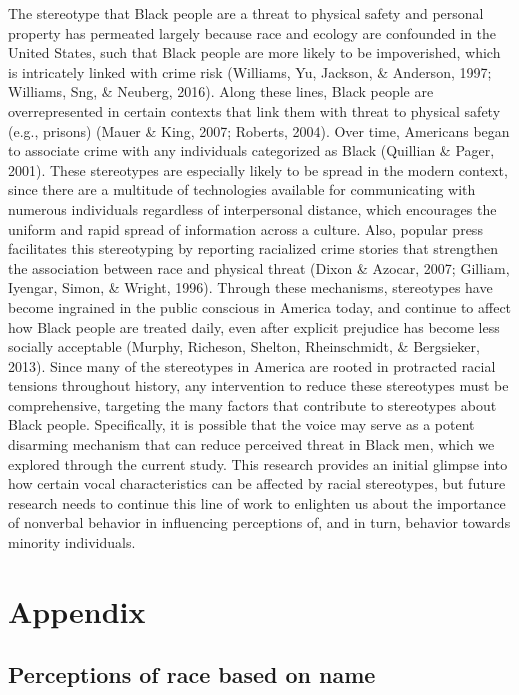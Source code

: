 \documentclass[
  english,
  man, noextraspace,floatsintext]{apa6}
\begin{document}
The stereotype that Black people are a threat to physical safety and personal property has permeated largely because race and ecology are confounded in the United States, such that Black people are more likely to be impoverished, which is intricately linked with crime risk (Williams, Yu, Jackson, \& Anderson, 1997; Williams, Sng, \& Neuberg, 2016). Along these lines, Black people are overrepresented in certain contexts that link them with threat to physical safety (e.g., prisons) (Mauer \& King, 2007; Roberts, 2004). Over time, Americans began to associate crime with any individuals categorized as Black (Quillian \& Pager, 2001). These stereotypes are especially likely to be spread in the modern context, since there are a multitude of technologies available for communicating with numerous individuals regardless of interpersonal distance, which encourages the uniform and rapid spread of information across a culture. Also, popular press facilitates this stereotyping by reporting racialized crime stories that strengthen the association between race and physical threat (Dixon \& Azocar, 2007; Gilliam, Iyengar, Simon, \& Wright, 1996). Through these mechanisms, stereotypes have become ingrained in the public conscious in America today, and continue to affect how Black people are treated daily, even after explicit prejudice has become less socially acceptable (Murphy, Richeson, Shelton, Rheinschmidt, \& Bergsieker, 2013). Since many of the stereotypes in America are rooted in protracted racial tensions throughout history, any intervention to reduce these stereotypes must be comprehensive, targeting the many factors that contribute to stereotypes about Black people. Specifically, it is possible that the voice may serve as a potent disarming mechanism that can reduce perceived threat in Black men, which we explored through the current study. This research provides an initial glimpse into how certain vocal characteristics can be affected by racial stereotypes, but future research needs to continue this line of work to enlighten us about the importance of nonverbal behavior in influencing perceptions of, and in turn, behavior towards minority individuals.

\hypertarget{appendix}{%
\section{Appendix}\label{appendix}}

\hypertarget{perceptions-of-race-based-on-name}{%
\subsection{Perceptions of race based on name}\label{perceptions-of-race-based-on-name}}
\end{document}
